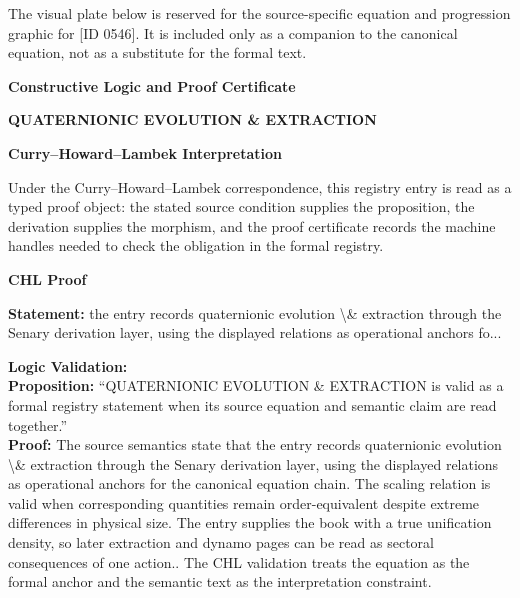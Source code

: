 \begingroup\footnotesize\sloppy
The visual plate below is reserved for the source-specific equation and progression graphic for [ID 0546]. It is included only as a companion to the canonical equation, not as a substitute for the formal text.
\par\endgroup
\ifTZPDarkEdition
{}
\fi

\clearpage
\begingroup\tzpsupportsetup
\noindent\textbf{\fontsize{10.8pt}{12.8pt}\selectfont [ID 0546] Constructive Logic and Proof Certificate}\par
\noindent\textbf{\fontsize{10pt}{12pt}\selectfont QUATERNIONIC EVOLUTION \& EXTRACTION}\par
\vspace{0.45em}
\begingroup
\footnotesize
\setlength{\parskip}{0.22em}
\setlength{\parindent}{0pt}
\noindent\textbf{Curry--Howard--Lambek Interpretation}\par
Under the Curry--Howard--Lambek correspondence, this registry entry is read as a typed proof
object: the stated source condition supplies the proposition, the derivation supplies the
morphism, and the proof certificate records the machine handles needed to check the obligation
in the formal registry.

\vspace{0.45em}
\noindent\textbf{CHL Proof}\par
\textbf{Statement:} the entry records quaternionic evolution \textbackslash{}\& extraction through the Senary derivation
layer, using the displayed relations as operational anchors fo...

\textbf{Logic Validation:}\\
\textbf{Proposition:} ``QUATERNIONIC EVOLUTION \& EXTRACTION is valid as a formal registry statement when its
source equation and semantic claim are read together.''\\
\textbf{Proof:} The source semantics state that the entry records quaternionic evolution \textbackslash{}\& extraction
through the Senary derivation layer, using the displayed relations as operational
anchors for the canonical equation chain. The scaling relation is valid when
corresponding quantities remain order-equivalent despite extreme differences in physical
size. The entry supplies the book with a true unification density, so later extraction
and dynamo pages can be read as sectoral consequences of one action.. The CHL validation
treats the equation as the formal anchor and the semantic text as the interpretation
constraint.

